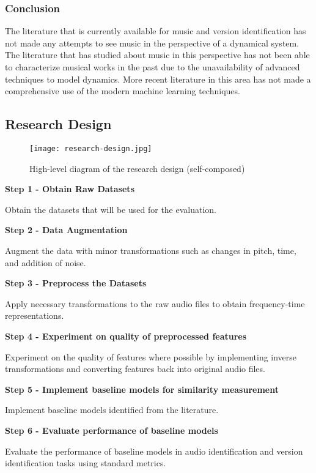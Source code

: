 \documentclass[../main.tex]{subfiles}
\begin{document}
\subsubsection{Conclusion}
\par
The literature that is currently available for music and version identification has not made any attempts to see music in the perspective of a dynamical system. The literature that has studied about music in this perspective has not been able to characterize musical works in the past due to the unavailability of advanced techniques to model dynamics. More recent literature in this area has not made a comprehensive use of the modern machine learning techniques.

\subsection{Research Design}

\begin{figure}[H]
    \centering
    \texttt{[image: research-design.jpg]}
    \caption{High-level diagram of the research design (self-composed)}
    \label{fig:research-design}
\end{figure}

\textbf{Step 1 - Obtain Raw Datasets}
\par
Obtain the datasets that will be used for the evaluation.

\textbf{Step 2 - Data Augmentation}
\par
Augment the data with minor transformations such as changes in pitch, time, and addition of noise.

\textbf{Step 3 - Preprocess the Datasets}
\par
Apply necessary transformations to the raw audio files to obtain frequency-time representations.

\textbf{Step 4 - Experiment on quality of preprocessed features}
\par
Experiment on the quality of features where possible by implementing inverse transformations and converting features back into original audio files.

\textbf{Step 5 - Implement baseline models for similarity measurement}
\nopagebreak
\par
Implement baseline models identified from the literature.

\textbf{Step 6 - Evaluate performance of baseline models}
\par
Evaluate the performance of baseline models in audio identification and version identification tasks using standard metrics.
\end{document}
